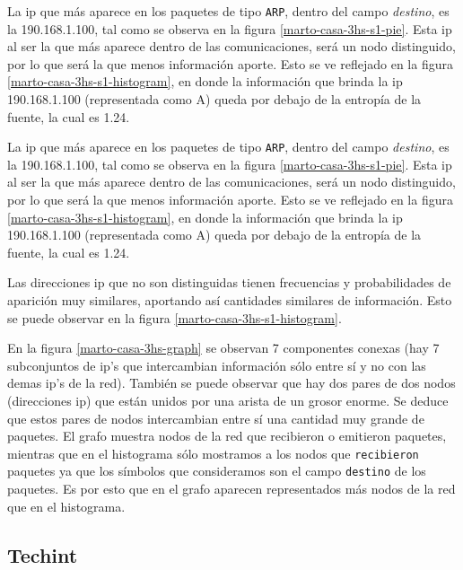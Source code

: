\documentclass[final,inline,a4paper,narroweqnarray]{ieee}
\begin{document}
  La ip que más aparece en los paquetes de tipo \texttt{ARP}, dentro
  del campo \textit{destino}, es la 190.168.1.100, tal como se observa
  en la figura \ref{marto-casa-3hs-s1-pie}. Esta ip al ser la que más
  aparece dentro de las comunicaciones, será un nodo distinguido, por
  lo que será la que menos información aporte. Esto se ve reflejado en
  la figura \ref{marto-casa-3hs-s1-histogram}, en donde la información
  que brinda la ip 190.168.1.100 (representada como A) queda por
  debajo de la entropía de la fuente, la cual es 1.24.
  
  La ip que más aparece en los paquetes de tipo \texttt{ARP}, dentro del
  campo \textit{destino}, es la 190.168.1.100, tal como se observa en la
  figura \ref{marto-casa-3hs-s1-pie}. Esta ip al ser la que más aparece
  dentro de las comunicaciones, será un nodo distinguido, por lo que será la
  que menos información aporte. Esto se ve reflejado en la figura
  \ref{marto-casa-3hs-s1-histogram}, en donde la información que brinda la
  ip 190.168.1.100 (representada como A) queda por debajo de la entropía de
  la fuente, la cual es 1.24.  

  Las direcciones ip que no son distinguidas tienen frecuencias y
  probabilidades de aparición muy similares, aportando así
  cantidades similares de información. Esto se puede observar en la figura
  \ref{marto-casa-3hs-s1-histogram}.

  En la figura \ref{marto-casa-3hs-graph} se observan 7 componentes conexas
  (hay 7 subconjuntos de ip's que intercambian información sólo entre sí y
  no con las demas ip's de la red). También se puede observar que hay dos
  pares de dos
  nodos (direcciones ip) que están unidos por una arista de un grosor
  enorme. Se deduce que estos pares de  nodos intercambian entre sí una cantidad
  muy grande de paquetes.
  El grafo muestra nodos de la red que recibieron o emitieron paquetes,
  mientras que en el histograma sólo mostramos a los nodos que
  \texttt{recibieron} paquetes ya que los símbolos que consideramos son el
  campo \texttt{destino} de los paquetes. Es por esto que en el grafo
  aparecen representados más nodos de la red que en el histograma.  

  \subsection{Techint}
\end{document}

